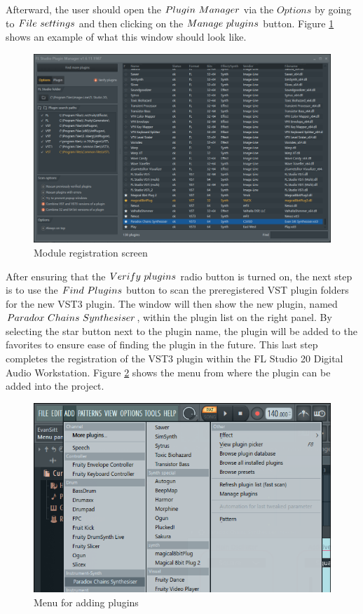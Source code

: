 \documentclass[a4paper,12pt]{report}
\begin{document}
Afterward, the user should open the $Plugin\ \-Manager$ via the $Options$ by going to $File\ \-settings$ and then clicking on the $Manage\ \-plugins$ button. Figure \ref{fig:modulereg} shows an example of what this window should look like.

\begin{figure} \centering
\includegraphics[width=36em]{ModuleRegistration.png}
    \caption{Module registration screen}     \label{fig:modulereg} \end{figure}

After ensuring that the $Verify\ \-plugins$ radio button is turned on, the next step is to use the $Find\ \-Plugins$ button to scan the preregistered VST plugin folders for the new VST3 plugin. The window will then show the new plugin, named $Paradox\ \-Chains\ \-Synthesiser$, within the plugin list on the right panel. By selecting the star button next to the plugin name, the plugin will be added to the favorites to ensure ease of finding the plugin in the future. This last step completes the registration of the VST3 plugin within the FL Studio 20 Digital Audio Workstation. Figure \ref{fig:addplugin} shows the menu from where the plugin can be added into the project.

\begin{figure} \centering
\includegraphics[width=32em]{AddPluginList.png}
    \caption{Menu for adding plugins}     \label{fig:addplugin} \end{figure}
\end{document}
